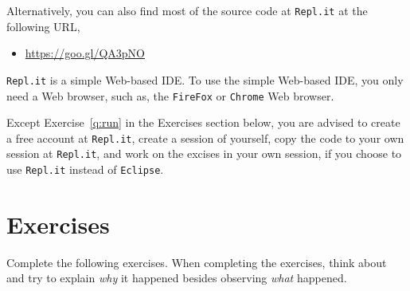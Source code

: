 \documentclass[11pt,letterpaper]{article}
\begin{document}
Alternatively, you can also find most of the source code at \texttt{Repl.it} at
the following URL,

\begin{itemize}
    \item \url{https://goo.gl/QA3pNO}
\end{itemize}

\noindent \texttt{Repl.it} is a simple Web-based IDE. To use the simple Web-based IDE, you
only need a Web browser, such as, the \texttt{FireFox} or \texttt{Chrome} Web
browser.  

Except Exercise~\ref{q:run} in the Exercises section below, you are
advised to create a free account at \texttt{Repl.it}, create a session of
yourself, copy the code to your own session at \texttt{Repl.it}, and work
on the excises in your own session, if you 
choose to use \texttt{Repl.it} instead of \texttt{Eclipse}.

\section{Exercises}

Complete the following exercises. When completing the exercises, think about
and try to explain {\em why} it happened besides observing {\em what} happened. 
\end{document}
